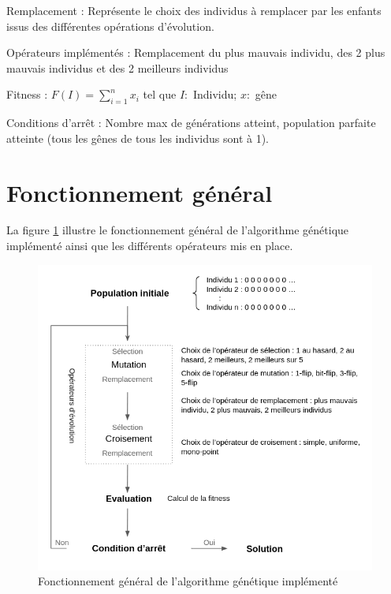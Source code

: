 \documentclass[12pt]{article}
\begin{document}
\begin{description}
\begin{itemize}[label=-]
\end{itemize} 

\item{Remplacement :} Représente le choix des individus à remplacer par les enfants issus des différentes opérations d'évolution.
\item{Opérateurs implémentés :} Remplacement du plus mauvais individu, des 2 plus mauvais individus et des 2 meilleurs individus

\item{Fitness :} $ F(I) = \sum_{i=1}^{n} x_i $   tel que $ I : $ Individu; $ x : $ gêne

\item{Conditions d'arrêt :} Nombre max de générations atteint, population parfaite atteinte (tous les gênes de tous les individus sont à 1).

\end{description}


\section{Fonctionnement général}
La figure \ref{fonct_algo} illustre le fonctionnement général de l'algorithme génétique implémenté ainsi que les différents opérateurs mis en place.

\begin{figure}[H]
		\begin{center}
			\includegraphics[scale=0.7]{img/fonct-algo.png}
			\caption{Fonctionnement général de l'algorithme génétique implémenté}
			\label{fonct_algo}
		\end{center}
\end{figure}
\end{document}
